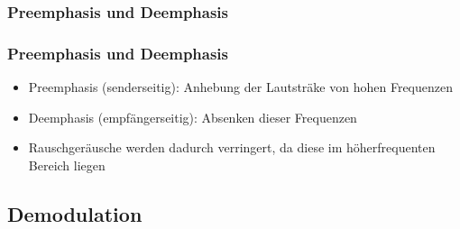 \subsubsection{Preemphasis und Deemphasis}
\begin{frame}
  \frametitle{Preemphasis und Deemphasis}
     \begin{itemize}
     	 \item Preemphasis (senderseitig): Anhebung der Lautsträke von hohen Frequenzen
	 \item Deemphasis (empfängerseitig): Absenken dieser Frequenzen
	 \item Rauschgeräusche werden dadurch verringert, da diese im höherfrequenten Bereich liegen
    	\end{itemize}
\end{frame}


\subsection{Demodulation}


